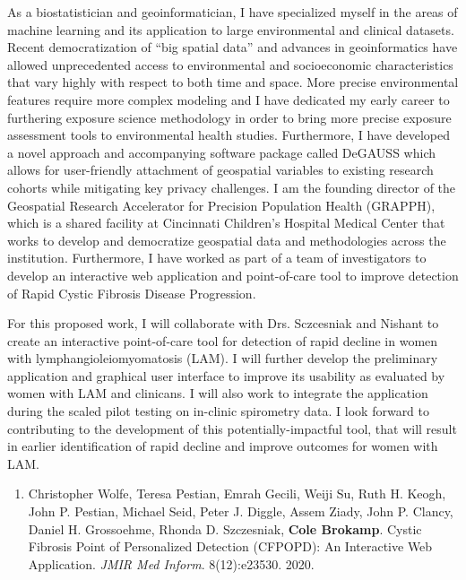 \documentclass{nihbiosketch}
\begin{document}
\begin{statement}

  As a biostatistician and geoinformatician, I have specialized myself in the areas of machine learning and its application to large environmental and clinical datasets. Recent democratization of “big spatial data” and advances in geoinformatics have allowed unprecedented access to environmental and socioeconomic characteristics that vary highly with respect to both time and space. More precise environmental features require more complex modeling and I have dedicated my early career to furthering exposure science methodology in order to bring more precise exposure assessment tools to environmental health studies. Furthermore, I have developed a novel approach and accompanying software package called DeGAUSS which allows for user-friendly attachment of geospatial variables to existing research cohorts while mitigating key privacy challenges. I am the founding director of the Geospatial Research Accelerator for Precision Population Health (GRAPPH), which is a shared facility at Cincinnati Children's Hospital Medical Center that works to develop and democratize geospatial data and methodologies across the institution. Furthermore, I have worked as part of a team of investigators to develop an interactive web application and point-of-care tool to improve detection of Rapid Cystic Fibrosis Disease Progression.

  For this proposed work, I will collaborate with Drs. Sczcesniak and Nishant to create an interactive point-of-care tool for detection of rapid decline in women with lymphangioleiomyomatosis (LAM). I will further develop the preliminary application and graphical user interface to improve its usability as evaluated by women with LAM and clinicans. I will also work to integrate the application during the scaled pilot testing on in-clinic spirometry data. I look forward to contributing to the development of this potentially-impactful tool, that will result in earlier identification of rapid decline and improve outcomes for women with LAM.

\begin{enumerate}

  \item Christopher Wolfe, Teresa Pestian, Emrah Gecili, Weiji Su, Ruth H. Keogh, John P. Pestian, Michael Seid, Peter J. Diggle, Assem Ziady, John P. Clancy, Daniel H. Grossoehme, Rhonda D. Szczesniak, \textbf{Cole Brokamp}. Cystic Fibrosis Point of Personalized Detection (CFPOPD): An Interactive Web Application. \emph{JMIR Med Inform}. 8(12):e23530. 2020.


\end{enumerate}
\end{statement}
\end{document}
